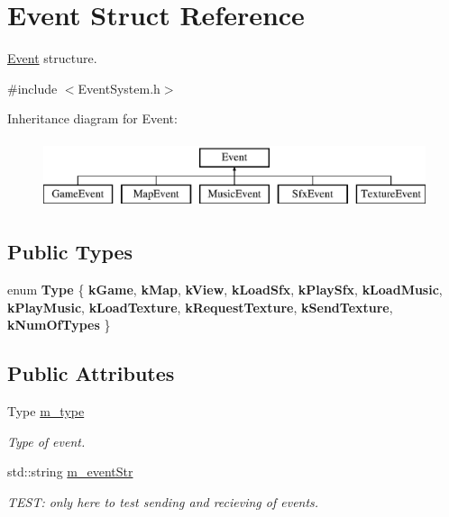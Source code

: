 \hypertarget{struct_event}{}\section{Event Struct Reference}
\label{struct_event}


\mbox{\hyperlink{struct_event}{Event}} structure.  




{\ttfamily \#include $<$Event\+System.\+h$>$}

Inheritance diagram for Event\+:\begin{figure}[H]
\begin{center}
\leavevmode
\includegraphics[height=2.000000cm]{struct_event}
\end{center}
\end{figure}
\subsection*{Public Types}
\begin{DoxyCompactItemize}
\item 
\mbox{\label{struct_event_a2abf13b5be49315e9e362af02029f058}} 
enum {\bfseries Type} \{ \newline
{\bfseries k\+Game}, 
{\bfseries k\+Map}, 
{\bfseries k\+View}, 
{\bfseries k\+Load\+Sfx}, 
\newline
{\bfseries k\+Play\+Sfx}, 
{\bfseries k\+Load\+Music}, 
{\bfseries k\+Play\+Music}, 
{\bfseries k\+Load\+Texture}, 
\newline
{\bfseries k\+Request\+Texture}, 
{\bfseries k\+Send\+Texture}, 
{\bfseries k\+Num\+Of\+Types}
 \}
\end{DoxyCompactItemize}
\subsection*{Public Attributes}
\begin{DoxyCompactItemize}
\item 
\mbox{\label{struct_event_a4b6df7508772bf848466b71623666c97}} 
Type \mbox{\hyperlink{struct_event_a4b6df7508772bf848466b71623666c97}{m\+\_\+type}}
\begin{DoxyCompactList}\small\item\em Type of event. \end{DoxyCompactList}\item 
\mbox{\label{struct_event_aa5135558b0fd21b4c385bdc01522cebf}} 
std\+::string \mbox{\hyperlink{struct_event_aa5135558b0fd21b4c385bdc01522cebf}{m\+\_\+event\+Str}}
\begin{DoxyCompactList}\small\item\em T\+E\+ST\+: only here to test sending and recieving of events. \end{DoxyCompactList}\end{DoxyCompactItemize}


